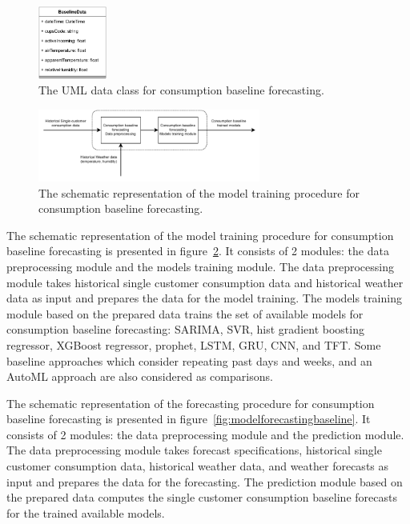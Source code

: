 \begin{figure}[H]
\centering
\includegraphics[width=0.20\textwidth]{images/baseline_uml}
\caption{The UML data class for consumption baseline forecasting.}
\label{fig:umlbaseline}
\end{figure}

\begin{figure}[H]
\centering
\includegraphics[width=0.65\textwidth]{images/system_model_training_baseline}
\caption{The schematic representation of the model training procedure for consumption baseline forecasting.}
\label{fig:modeltrainingbaseline}
\end{figure}

The schematic representation of the model training procedure for consumption baseline forecasting is presented in figure~\ref{fig:modeltrainingbaseline}.
It consists of 2 modules: the data preprocessing module and the models training module.
The data preprocessing module takes historical single customer consumption data and historical weather data as input and prepares the data for the model training.
The models training module based on the prepared data trains the set of available models for consumption baseline forecasting: SARIMA, SVR, hist gradient boosting regressor, XGBoost regressor, prophet, LSTM, GRU, CNN, and TFT.
Some baseline approaches which consider repeating past days and weeks, and an AutoML approach are also considered as comparisons.

The schematic representation of the forecasting procedure for consumption baseline forecasting is presented in figure~\ref{fig:modelforecastingbaseline}.
It consists of 2 modules: the data preprocessing module and the prediction module.
The data preprocessing module takes forecast specifications, historical single customer consumption data, historical weather data, and weather forecasts as input and prepares the data for the forecasting.
The prediction module based on the prepared data computes the single customer consumption baseline forecasts for the trained available models.

